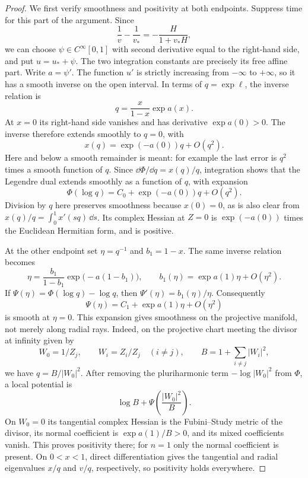 \begin{proof}
We first verify smoothness and positivity at both endpoints.  Suppress
time for this part of the argument.  Since
\begin{equation}\label{geo:smooth-legendre}
 \frac1v-\frac1{v_*}=-\frac{H}{1+v_*H},
\end{equation}
we can choose \(\psi\in C^\infty[0,1]\) with second derivative equal to
the right-hand side, and put \(u=u_*+\psi\).  The two integration
constants are precisely its free affine part.  Write \(a=\psi'\).
The function \(u'\) is strictly increasing from \(-\infty\) to
\(+\infty\), so it has a smooth inverse on the open interval.  In terms
of \(q=\exp\ell\), the inverse relation is
\begin{equation}\label{geo:center-inverse}
 q=\frac{x}{1-x}\exp a(x).
\end{equation}
At \(x=0\) its right-hand side vanishes and has derivative
\(\exp a(0)>0\).  The inverse therefore extends smoothly to \(q=0\),
with
\[
 x(q)=\exp(-a(0))q+O(q^2).
\]
Here and below a smooth remainder is meant: for example the last error
is \(q^2\) times a smooth function of \(q\).  Since
\(\dd\Phi/\dd q=x(q)/q\), integration shows that the Legendre dual
extends smoothly as a function of \(q\), with expansion
\begin{equation}\label{geo:center-expansion}
 \Phi(\log q)=C_0+\exp(-a(0))q+O(q^2).
\end{equation}
Division by \(q\) here preserves smoothness because \(x(0)=0\), as is
also clear from \(x(q)/q=\int_0^1x'(sq)\,\dd s\).
Its complex Hessian at \(Z=0\) is
\(\exp(-a(0))\) times the Euclidean Hermitian form, and is positive.

At the other endpoint set \(\eta=q^{-1}\) and \(b_1=1-x\).  The same
inverse relation becomes
\[
 \eta=\frac{b_1}{1-b_1}\exp\big(-a(1-b_1)\big),\qquad
 b_1(\eta)=\exp a(1)\eta+O(\eta^2).
\]
If \(\Psi(\eta)=\Phi(\log q)-\log q\), then
\(\Psi'(\eta)=b_1(\eta)/\eta\).  Consequently
\begin{equation}\label{geo:infinity-expansion}
 \Psi(\eta)=C_1+\exp a(1)\eta+O(\eta^2)
\end{equation}
is smooth at \(\eta=0\).  This expansion gives smoothness on the
projective manifold, not merely along radial rays.  Indeed, on the
projective chart meeting the divisor at infinity given by
\[
 W_0=1/Z_j,\qquad W_i=Z_i/Z_j\quad(i\ne j),\qquad
 B=1+\sum_{i\ne j}|W_i|^2,
\]
we have \(q=B/|W_0|^2\).  After removing the pluriharmonic term
\(-\log|W_0|^2\) from \(\Phi\), a local potential is
\begin{equation}\label{geo:divisor-potential}
 \log B+\Psi\!\left(\frac{|W_0|^2}{B}\right).
\end{equation}
On \(W_0=0\) its tangential complex Hessian is the Fubini--Study metric
of the divisor, its normal coefficient is \(\exp a(1)/B>0\), and its
mixed coefficients vanish.  This proves positivity there; for \(n=1\)
only the normal coefficient is present.  On \(0<x<1\), direct
differentiation gives the tangential and radial eigenvalues
\(x/q\) and \(v/q\), respectively, so positivity holds everywhere.


\end{proof}
